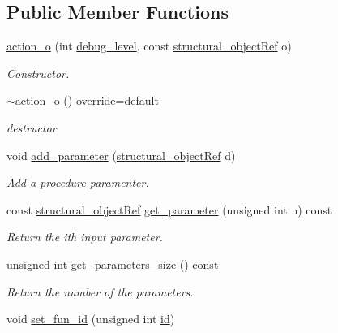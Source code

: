 \subsection*{Public Member Functions}
\begin{DoxyCompactItemize}
\item 
\hyperlink{classaction__o_a6aa8f1b9ef49fa9e12f83f0d7f8bd91c}{action\+\_\+o} (int \hyperlink{classstructural__object_ac2744292aa7f0fca3742133d16bb3201}{debug\+\_\+level}, const \hyperlink{structural__objects_8hpp_a8ea5f8cc50ab8f4c31e2751074ff60b2}{structural\+\_\+object\+Ref} o)
\begin{DoxyCompactList}\small\item\em Constructor. \end{DoxyCompactList}\item 
\hyperlink{classaction__o_a7fc419000ac693d2000cd4589aff755b}{$\sim$action\+\_\+o} () override=default
\begin{DoxyCompactList}\small\item\em destructor \end{DoxyCompactList}\item 
void \hyperlink{classaction__o_ad01f839f6e81c75249b384849289dc34}{add\+\_\+parameter} (\hyperlink{structural__objects_8hpp_a8ea5f8cc50ab8f4c31e2751074ff60b2}{structural\+\_\+object\+Ref} d)
\begin{DoxyCompactList}\small\item\em Add a procedure paramenter. \end{DoxyCompactList}\item 
const \hyperlink{structural__objects_8hpp_a8ea5f8cc50ab8f4c31e2751074ff60b2}{structural\+\_\+object\+Ref} \hyperlink{classaction__o_a76a059c83cb9b86fe270841b5eb9d219}{get\+\_\+parameter} (unsigned int n) const
\begin{DoxyCompactList}\small\item\em Return the ith input parameter. \end{DoxyCompactList}\item 
unsigned int \hyperlink{classaction__o_aecd3200231e0479c8e951cb1d95ece9d}{get\+\_\+parameters\+\_\+size} () const
\begin{DoxyCompactList}\small\item\em Return the number of the parameters. \end{DoxyCompactList}\item 
void \hyperlink{classaction__o_ad66c6ac5bcb4cbdb45e0a84062b58aee}{set\+\_\+fun\+\_\+id} (unsigned int \hyperlink{classstructural__object_a841a75f6e349ff7c1987dc92d4ac33a6}{id})

\end{DoxyCompactItemize}
